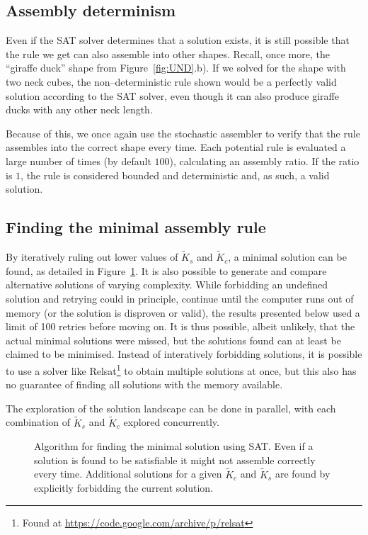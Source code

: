 \subsection{Assembly determinism}
Even if the SAT solver determines that a solution exists, it is still possible that the rule we get can also assemble into other shapes. Recall, once more, the ``giraffe duck'' shape from Figure~\ref{fig:UND}.b). If we solved for the shape with two neck cubes, the non--deterministic rule shown would be a perfectly valid solution according to the SAT solver, even though it can also produce giraffe ducks with any other neck length.

Because of this, we once again use the stochastic assembler to verify that the rule assembles into the correct shape every time. Each potential rule is evaluated a large number of times (by default \(100\)), calculating an assembly ratio. If the ratio is \(1\), the rule is considered bounded and deterministic and, as such, a valid solution.


\subsection{Finding the minimal assembly rule}

By iteratively ruling out lower values of \(\widetilde{K}_s\) and \(\widetilde{K}_c\), a minimal solution can be found, as detailed in Figure~\ref{fig:sat_alg}. It is also possible to generate and compare alternative solutions of varying complexity. While forbidding an undefined solution and retrying could in principle, continue until the computer runs out of memory (or the solution is disproven or valid), the results presented below used a limit of 100 retries before moving on. It is thus possible, albeit unlikely, that the actual minimal solutions were missed, but the solutions found can at least be claimed to be minimised. Instead of interatively forbidding solutions, it is possible to use a solver like Relsat\footnote{Found at \url{https://code.google.com/archive/p/relsat}} to obtain multiple solutions at once, but this also has no guarantee of finding all solutions with the memory available.

The exploration of the solution landscape can be done in parallel, with each combination of \(\widetilde{K}_s\) and \(\widetilde{K}_c\) explored concurrently.

\begin{figure}
    \centering
    \resizebox{\textwidth}{!}{}
    \caption{Algorithm for finding the minimal solution using SAT. Even if a solution is found to be satisfiable it might not assemble correctly every time. Additional solutions for a given \(\widetilde{K}_c\) and \(\widetilde{K}_s\) are found by explicitly forbidding the current solution. }
    \label{fig:sat_alg}
\end{figure}

